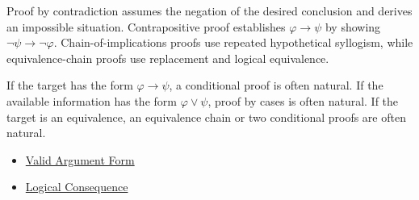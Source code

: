 \begin{remark*}[Exposition]
Proof by contradiction assumes the negation of the desired conclusion and derives
an impossible situation. Contrapositive proof establishes \(\varphi\to\psi\) by
showing \(\neg\psi\to\neg\varphi\). Chain-of-implications proofs use repeated
hypothetical syllogism, while equivalence-chain proofs use replacement and
logical equivalence.
\end{remark*}

\begin{remark*}[Exposition]
If the target has the form \(\varphi\to\psi\), a conditional proof is often
natural. If the available information has the form \(\varphi\lor\psi\), proof by
cases is often natural. If the target is an equivalence, an equivalence chain or
two conditional proofs are often natural.
\end{remark*}

\begin{dependencies}
\begin{itemize}
  \item \hyperref[def:valid-argument-form-propositional-logic]{Valid Argument Form}
  \item \hyperref[def:logical-consequence-propositional-logic]{Logical Consequence}
\end{itemize}
\end{dependencies}
